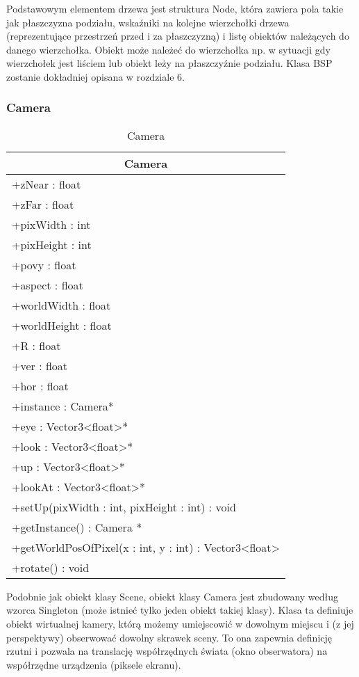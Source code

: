 Podstawowym elementem drzewa jest struktura Node, która zawiera pola takie jak płaszczyzna podziału, wskaźniki na kolejne wierzchołki drzewa (reprezentujące przestrzeń przed i za płaszczyzną) i listę obiektów należących do danego wierzchołka. Obiekt może należeć do wierzchołka np. w sytuacji gdy wierzchołek jest liściem lub obiekt leży na płaszczyźnie podziału. Klasa BSP zostanie dokładniej opisana w rozdziale 6.

\subsubsection{Camera}

\footnotesize
\begin{longtable}{|p{14cm}|}
    \caption{Camera} \label{tab:Camera} \\ \hline
    \multicolumn{1}{|c|}{Camera} \\ \hline
    +zNear : float \\
    +zFar : float \\
    +pixWidth : int \\
    +pixHeight : int \\
    +povy : float \\
    +aspect : float \\
    +worldWidth : float \\
    +worldHeight : float \\
    +R : float \\
    +ver : float \\
    +hor : float \\
    +instance : Camera* \\ 
    +eye : Vector3<float>* \\
    +look : Vector3<float>* \\
    +up : Vector3<float>* \\
    +lookAt : Vector3<float>* \\
    \hline
    +setUp(pixWidth : int, pixHeight : int) : void \\
    +getInstance() : Camera * \\
    +getWorldPosOfPixel(x : int, y : int) : Vector3<float> \\
    +rotate() : void \\
    \hline
\end{longtable}
\normalsize

Podobnie jak obiekt klasy Scene, obiekt klasy Camera jest zbudowany według wzorca Singleton (może istnieć tylko jeden obiekt takiej klasy). Klasa ta definiuje obiekt wirtualnej kamery, którą możemy umiejscowić w dowolnym miejscu i (z jej perspektywy) obserwować dowolny skrawek sceny. To ona zapewnia definicję rzutni i pozwala na translację współrzędnych świata (okno obserwatora) na współrzędne urządzenia (piksele ekranu).

